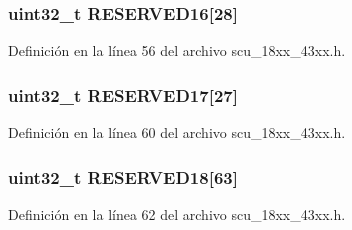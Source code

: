 \subsubsection[{\texorpdfstring{R\+E\+S\+E\+R\+V\+E\+D16}{RESERVED16}}]{ uint32\+\_\+t R\+E\+S\+E\+R\+V\+E\+D16\mbox{[}28\mbox{]}}\hypertarget{struct_l_p_c___s_c_u___t_a0581ecf82eacd79ff91f505f8e0fc668}{}\label{struct_l_p_c___s_c_u___t_a0581ecf82eacd79ff91f505f8e0fc668}


Definición en la línea 56 del archivo scu\+\_\+18xx\+\_\+43xx.\+h.

\subsubsection[{\texorpdfstring{R\+E\+S\+E\+R\+V\+E\+D17}{RESERVED17}}]{ uint32\+\_\+t R\+E\+S\+E\+R\+V\+E\+D17\mbox{[}27\mbox{]}}\hypertarget{struct_l_p_c___s_c_u___t_a323d6d64e5b0ed3b3dc69e6d2ab37bf6}{}\label{struct_l_p_c___s_c_u___t_a323d6d64e5b0ed3b3dc69e6d2ab37bf6}


Definición en la línea 60 del archivo scu\+\_\+18xx\+\_\+43xx.\+h.

\subsubsection[{\texorpdfstring{R\+E\+S\+E\+R\+V\+E\+D18}{RESERVED18}}]{ uint32\+\_\+t R\+E\+S\+E\+R\+V\+E\+D18\mbox{[}63\mbox{]}}\hypertarget{struct_l_p_c___s_c_u___t_a78acd8160a6a980743e7c5d0c3253eee}{}\label{struct_l_p_c___s_c_u___t_a78acd8160a6a980743e7c5d0c3253eee}


Definición en la línea 62 del archivo scu\+\_\+18xx\+\_\+43xx.\+h.


